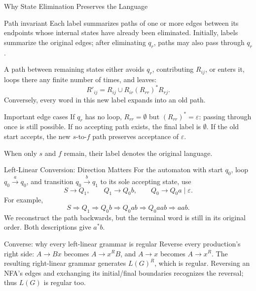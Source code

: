 \documentclass[10pt]{beamer}
\begin{document}
\begin{frame}{Why State Elimination Preserves the Language}
  \small
  \begin{block}{Path invariant}
    Each label summarizes paths of one or more edges between its endpoints
    whose internal states have already been eliminated. Initially, labels summarize the original
    edges; after eliminating $q_r$, paths may also pass through $q_r$.
  \end{block}
  \pause
  A path between remaining states either avoids $q_r$, contributing
  $R_{ij}$, or enters it, loops there any finite number of times, and leaves:
  \[
    R'_{ij}=R_{ij}\cup R_{ir}(R_{rr})^*R_{rj}.
  \]
  Conversely, every word in this new label expands into an old path.
  \pause
  \begin{alertblock}{Important edge cases}
    If $q_r$ has no loop, $R_{rr}=\emptyset$ but $(R_{rr})^*=\varepsilon$:
    passing through once is still possible. If no accepting path exists,
    the final label is $\emptyset$. If the old start accepts, the new
    $s$-to-$f$ path preserves acceptance of $\varepsilon$.
  \end{alertblock}
  When only $s$ and $f$ remain, their label denotes the original language.
\end{frame}

\begin{frame}{Left-Linear Conversion: Direction Matters}
  \small
  For the automaton with start $q_0$, loop $q_0\xrightarrow{a}q_0$, and
  transition $q_0\xrightarrow{b}q_1$ to its sole accepting state, use
  \[
    S\to Q_1,\qquad Q_1\to Q_0b,\qquad
    Q_0\to Q_0a\mid\varepsilon.
  \]
  For example,
  \[
    S\Rightarrow Q_1\Rightarrow Q_0b\Rightarrow Q_0ab
      \Rightarrow Q_0aab\Rightarrow aab.
  \]
  We reconstruct the path backwards, but the terminal word is still in its
  original order. Both descriptions give $a^*b$.
  \pause
  \begin{block}{Converse: why every left-linear grammar is regular}
    Reverse every production's right side: $A\to Bx$ becomes
    $A\to x^RB$, and $A\to x$ becomes $A\to x^R$. The resulting
    right-linear grammar generates $L(G)^R$, which is regular. Reversing an
    NFA's edges and exchanging its initial/final boundaries recognizes the
    reversal; thus $L(G)$ is regular too.
  \end{block}
\end{frame}
\end{document}
